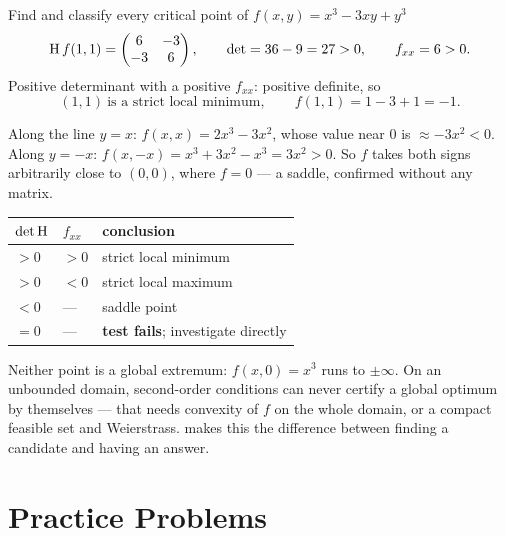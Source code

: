 \begin{worked}{Find and classify every critical point of $f(x,y)=x^{3}-3xy+y^{3}$}
\[
  \operatorname{H} f(1,1)=\begin{pmatrix}6&-3\\-3&6\end{pmatrix},
  \qquad
  \det=36-9=27>0,
  \qquad
  f_{xx}=6>0 .
\]
Positive determinant with a positive $f_{xx}$: positive definite, so
\[
  \boxed{(1,1)\ \text{is a strict local minimum},\qquad f(1,1)=1-3+1=-1 .}
\]

Along the line $y=x$: $f(x,x)=2x^{3}-3x^{2}$, whose value near $0$ is
$\approx-3x^{2}<0$. Along $y=-x$: $f(x,-x)=x^{3}+3x^{2}-x^{3}=3x^{2}>0$. So
$f$ takes both signs arbitrarily close to $(0,0)$, where $f=0$ --- a saddle,
confirmed without any matrix.

\begin{center}\footnotesize
\begin{tabular}{lll}
  \hline
  $\det\operatorname{H}$ & $f_{xx}$ & conclusion\\
  \hline
  $>0$ & $>0$ & strict local minimum\\
  $>0$ & $<0$ & strict local maximum\\
  $<0$ & --- & saddle point\\
  $=0$ & --- & \textbf{test fails}; investigate directly\\
  \hline
\end{tabular}
\end{center}

Neither point is a global extremum: $f(x,0)=x^{3}$ runs to $\pm\infty$. On
an unbounded domain, second-order conditions can never certify a global
optimum by themselves --- that needs convexity of $f$ on the whole domain,
or a compact feasible set and Weierstrass.  makes this the
difference between finding a candidate and having an answer.
\end{worked}

\section{Practice Problems}

